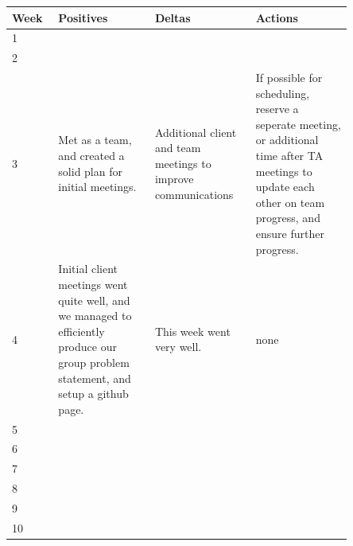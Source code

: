 \documentclass[onecolumn, draftclsnofoot,10pt, compsoc]{IEEEtran}
\begin{document}
\begin{center}
\begin{tabular}{
|p{0.1\linewidth}
|p{0.25\linewidth}
|p{0.25\linewidth}
|p{0.25\linewidth}|
}
\hline
Week & Positives & Deltas & Actions \\
\hline
1  &  &  &  \\\hline
2  &  &  &  \\\hline
3  & Met as a team, and created a solid plan for initial meetings. & Additional client and team meetings to improve communications & If possible for scheduling, reserve a seperate meeting, or additional time after TA meetings to update each other on team progress, and ensure further progress. \\\hline
4  & Initial client meetings went quite well, and we managed to efficiently produce our group problem statement, and setup a github page. & This week went very well. & none \\\hline
5  &  &  &  \\\hline
6  &  &  &  \\\hline
7  &  &  &  \\\hline
8  &  &  &  \\\hline
9  &  &  &  \\\hline
10 &  &  &  \\\hline





\end{tabular}

\end{center}
\end{document}
